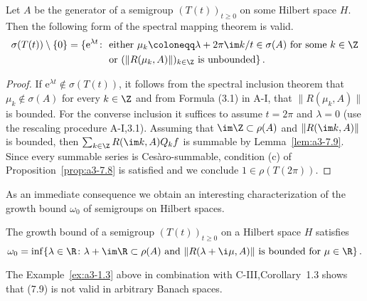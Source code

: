 \begin{theorem}\label{thm:a3-7.10}
Let $A$ be the generator of a semigroup $(T(t))_{t\geq 0}$ on some Hilbert space $H$.
Then the following form of the spectral mapping theorem is valid.
\begin{align*}
\sigma(T(t))\setminus\{0\} = \{\mathrm{e}^{\lambda t} \colon
& \text{ either } \mu_{k}\coloneqq \lambda + 2\pi\im  k/t \in \sigma(A) \text{ for some } k \in \Z\\
& \text{ or } (\|R(\mu_{k},A)\|)_{k\in\Z} \text{ is unbounded}\}\,.
\end{align*}
\end{theorem}
\begin{proof}
If $\mathrm{e}^{\lambda t} \not\in \sigma(T(t))$, it follows from the spectral inclusion theorem that $\mu_{k} \not\in \sigma(A)$ for every $k \in \Z$ and from Formula (3.1) in A-I, that $\|R(\mu_{k},A)\|$ is bounded.
For the converse inclusion it suffices to assume $t = 2\pi$ and $\lambda = 0$ (use the rescaling procedure A-I,3.1).
Assuming that $\im\Z \subset \rho(A)$ and $\|R(\im k,A)\|$ is bounded, then $\sum_{k\in\Z} R(\im k,A)Q_{k}f$ is summable by Lemma~\ref{lem:a3-7.9}.
Since every summable series is Cesàro-summable, condition (c) of Proposition~\ref{prop:a3-7.8} is satisfied and we conclude $1 \in \rho(T(2\pi))$.
\end{proof}
As an immediate consequence we obtain an interesting characterization of the growth bound $\omega_{0}$ of semigroups on Hilbert spaces.
\begin{corollary}\label{cor:a3-7.11}
The growth bound of a semigroup $(T(t))_{t\geq 0}$ on a Hilbert space $H$ satisfies
\begin{equation}\label{eq:a3-7.9}
\omega_{0} = \inf \{\lambda \in \R \colon \lambda + \im\R \subset \rho(A) \text{ and } \|R(\lambda+\i\mu,A)\| \text{ is bounded for } \mu \in \R\}\,.
\end{equation}
\end{corollary}
The Example~\ref{ex:a3-1.3} above in combination with C-III,Corollary~1.3 shows that (7.9) is not valid in arbitrary Banach spaces.


